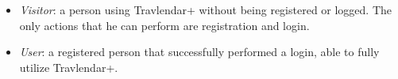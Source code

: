 \begin{itemize}
\item \textit{Visitor}: a person using Travlendar+ without being registered or logged. The only actions that he can perform are registration and login.
\item \textit{User}: a registered person that successfully performed a login, able to fully utilize Travlendar+.
\end{itemize}